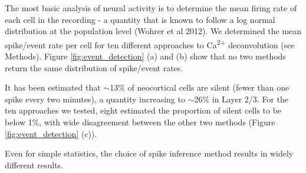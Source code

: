 \documentclass[a4paper]{article}
\begin{document}
The most basic analysis of neural activity is to determine the mean firing rate of each cell in the recording - a quantity that is known to follow a log normal distribution at the population level (Wohrer et al 2012). We determined the mean spike/event rate per cell for ten different approaches to Ca\textsuperscript{2+} deconvolution (see Methods). Figure \ref{fig:event_detection} (a) and (b) show that no two methods return the same distribution of spike/event rates. 

It has been estimated that $\sim$13\% of neocortical cells are silent (fewer than one spike every two minutes), a quantity increasing to $\sim$26\% in Layer 2/3. For the ten approaches we tested, eight estimated the proportion of silent cells to be below 1\%, with wide disagreement between the other two methods (Figure \ref{fig:event_detection} (c)). 

Even for simple statistics, the choice of spike inference method results in widely different results.
\end{document}
